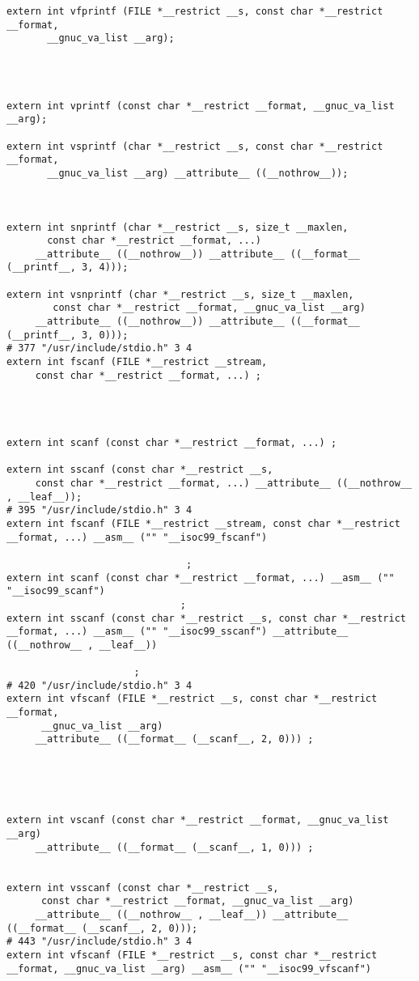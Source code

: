 \documentclass[11pt]{article}
\begin{document}
\begin{enumerate}
\begin{verbatim}
extern int vfprintf (FILE *__restrict __s, const char *__restrict __format,
       __gnuc_va_list __arg);




extern int vprintf (const char *__restrict __format, __gnuc_va_list __arg);

extern int vsprintf (char *__restrict __s, const char *__restrict __format,
       __gnuc_va_list __arg) __attribute__ ((__nothrow__));



extern int snprintf (char *__restrict __s, size_t __maxlen,
       const char *__restrict __format, ...)
     __attribute__ ((__nothrow__)) __attribute__ ((__format__ (__printf__, 3, 4)));

extern int vsnprintf (char *__restrict __s, size_t __maxlen,
        const char *__restrict __format, __gnuc_va_list __arg)
     __attribute__ ((__nothrow__)) __attribute__ ((__format__ (__printf__, 3, 0)));
# 377 "/usr/include/stdio.h" 3 4
extern int fscanf (FILE *__restrict __stream,
     const char *__restrict __format, ...) ;




extern int scanf (const char *__restrict __format, ...) ;

extern int sscanf (const char *__restrict __s,
     const char *__restrict __format, ...) __attribute__ ((__nothrow__ , __leaf__));
# 395 "/usr/include/stdio.h" 3 4
extern int fscanf (FILE *__restrict __stream, const char *__restrict __format, ...) __asm__ ("" "__isoc99_fscanf")

                               ;
extern int scanf (const char *__restrict __format, ...) __asm__ ("" "__isoc99_scanf")
                              ;
extern int sscanf (const char *__restrict __s, const char *__restrict __format, ...) __asm__ ("" "__isoc99_sscanf") __attribute__ ((__nothrow__ , __leaf__))

                      ;
# 420 "/usr/include/stdio.h" 3 4
extern int vfscanf (FILE *__restrict __s, const char *__restrict __format,
      __gnuc_va_list __arg)
     __attribute__ ((__format__ (__scanf__, 2, 0))) ;





extern int vscanf (const char *__restrict __format, __gnuc_va_list __arg)
     __attribute__ ((__format__ (__scanf__, 1, 0))) ;


extern int vsscanf (const char *__restrict __s,
      const char *__restrict __format, __gnuc_va_list __arg)
     __attribute__ ((__nothrow__ , __leaf__)) __attribute__ ((__format__ (__scanf__, 2, 0)));
# 443 "/usr/include/stdio.h" 3 4
extern int vfscanf (FILE *__restrict __s, const char *__restrict __format, __gnuc_va_list __arg) __asm__ ("" "__isoc99_vfscanf")




\end{verbatim}
\end{enumerate}
\end{document}
